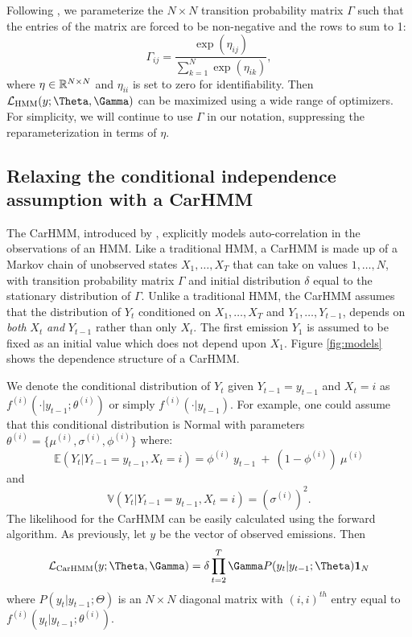 Following \citet{Barajas:2017}, we parameterize the $N \times N$ transition probability matrix $\Gamma$ such that the entries of the matrix are forced to be non-negative and the rows to sum to 1:
%
\[
\Gamma_{ij} = \frac{\exp(\eta_{ij})}{\sum_{k=1}^N \exp(\eta_{ik})}, 
\]
%
where $\eta \in \mathbb{R}^{N \times N}$ and $\eta_{ii}$ is set to zero for identifiability.  Then $\calL_{\text{HMM}}(y;\Theta,\Gamma)$ can be maximized using a wide range of optimizers.  For simplicity, we will continue to use $\Gamma$ in our notation, suppressing the reparameterization in terms of  $\eta$.


\subsection{Relaxing the conditional independence assumption with a CarHMM}

The CarHMM, introduced by \citet{Lawler:2019}, explicitly models auto-correlation in the observations of an HMM. Like a traditional HMM, a CarHMM is made up of a Markov chain of unobserved states $X_1,\ldots, X_T$ that can take on values $1, \ldots, N$, with transition probability matrix $\Gamma$ and initial distribution $\delta$ equal to the stationary distribution of $\Gamma$. Unlike a traditional HMM, the CarHMM assumes that the distribution of $Y_t$ conditioned on $X_1,\ldots, X_T$ and $Y_1,\ldots, Y_{t-1}$, depends on \textit{both} $X_t$ \textit{and} $Y_{t-1}$ rather than only $X_t$. 
The first emission $Y_1$ is assumed to be fixed as an initial value which does not depend upon $X_1$. Figure \ref{fig:models} shows the dependence structure of a CarHMM.

%
We denote the conditional distribution of $Y_t$ given $Y_{t-1}= y_{t-1}$ and $X_t=i$ as $f^{(i)}( \cdot | y_{t-1}; \theta^{(i)})$ or simply $f^{(i)}( \cdot | y_{t-1})$.
For example, one could assume that this conditional distribution is Normal with parameters $\theta^{(i)} = \{\mu^{(i)},\sigma^{(i)},\phi^{(i)}\}$ where:
%
\[
\mathbb{E}(Y_t|Y_{t-1} = y_{t-1},X_t=i) = \phi^{(i)} ~ y_{t-1} ~+ ~(1-\phi^{(i)})  ~\mu^{(i)}
\]
and
\[
\mathbb{V}(Y_t| Y_{t-1} =y_{t-1}, X_t = i) = (\sigma^{(i)})^2.
\]
%
The likelihood for the CarHMM can be easily calculated using the forward algorithm. As previously, let $y$ be the vector of observed emissions. Then
\begin{equation}
    \calL_{\text{CarHMM}}(y;\Theta,\Gamma) = \delta \prod_{t=2}^T \Gamma P(y_t|y_{t-1};\Theta) \mathbf{1}_N
    \label{CarHMM_likelihood}
\end{equation}
where
%
$P(y_t|y_{t-1};\Theta)$ is an $N \times N$ diagonal matrix with $(i,i)^{th}$ entry equal to $f^{(i)}(y_t|y_{t-1}; \theta^{(i)})$.

